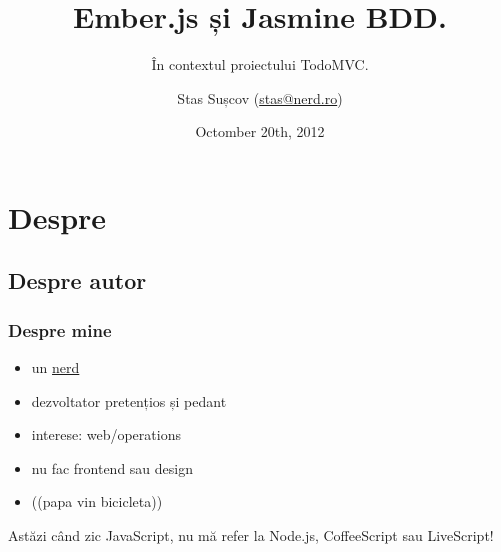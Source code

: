 \documentclass[compress]{beamer}
\title{Ember.js și Jasmine BDD.}
\subtitle{În contextul proiectului TodoMVC.}
\author{Stas Sușcov (\href{mailto:stas@nerd.ro}{stas@nerd.ro})}
\date{Octomber 20th, 2012}
\institute{GeekMeet \#12, Cluj-Napoca, Transilvania}
\begin{document}
\maketitle


\section{Despre}

\subsection{Despre autor}

\begin{frame}
\frametitle{Despre mine}

\begin{itemize}[<+->]
  \item un \href{http://stas.nerd.ro}{nerd}
  \item dezvoltator pretențios și pedant
  \item interese: web/operations
  \item nu fac frontend sau design
  \item (\Heart (papa vin bicicleta))
\end{itemize}
\end{frame}

\begin{frame}
  \begin{center}
  \huge Astăzi când zic JavaScript, nu mă refer la Node.js, CoffeeScript sau LiveScript!
  \end{center}
\end{frame}
\end{document}
